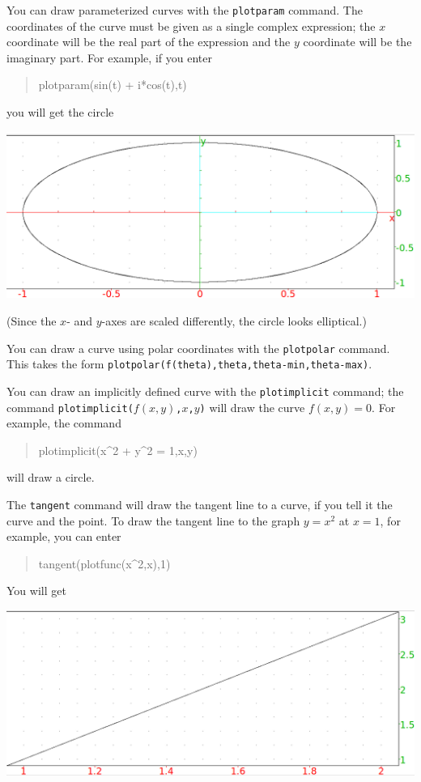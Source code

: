\documentclass{article}
\newcommand{\xcasin}[1]
{\begin{quote}\ttfamily
#1
\end{quote}}
\begin{document}
You can draw parameterized curves with the \texttt{plotparam} command.
The coordinates of the curve must be given as a single complex
expression; the $x$ coordinate will be the real part of the expression
and the $y$ coordinate will be the imaginary part.  For example, if
you enter
\xcasin{plotparam(sin(t) + i*cos(t),t)}
you will get the circle
\begin{center}
\includegraphics[width=\textwidth]{xcas-plotparam.png}
\end{center}
(Since the $x$- and $y$-axes are scaled differently, the circle
looks elliptical.)

You can draw a curve using polar coordinates with the
\texttt{plotpolar} command.  This takes the form
\texttt{plotpolar(f(theta),theta,theta-min,theta-max)}.

You can draw an implicitly defined curve with the
\texttt{plotimplicit} command; the command
\texttt{plotimplicit($f(x,y)$,$x$,$y$)} will draw the curve
$f(x,y)=0$.  For example, the command
\xcasin{plotimplicit(x\^{}2 + y\^{}2 = 1,x,y)}
will draw a circle.

The \texttt{tangent} command will draw the tangent line to a curve, if
you tell it the curve and the point.  To draw the tangent line to the
graph $y=x^2$ at $x=1$, for example, you can enter
\xcasin{tangent(plotfunc(x\^{}2,x),1)}
You will get
\begin{center}
\includegraphics[width=\textwidth]{xcas-tangent.png}
\end{center}
\end{document}
